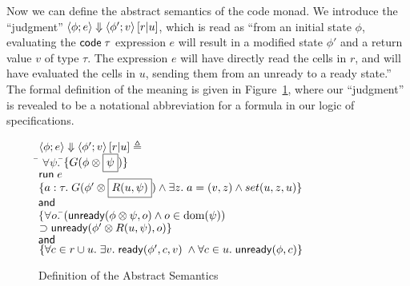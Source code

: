 \documentclass[preprint,natbib]{sigplanconf}
\begin{document}
Now we can define the abstract semantics of the code monad. We
introduce the ``judgment'' $\left<{\phi};{e}\right>\Downarrow\left<{\phi'};{v}\right>\left[{r}|{u}\right]$, which is
read as ``from an initial state $\phi$, evaluating the
$\mbox{\textsf{{code}}}\;{\tau}$ expression $e$ will result in a modified state
$\phi'$ and a return value $v$ of type $\tau$. The expression $e$ will
have directly read the cells in $r$, and will have evaluated the cells
in $u$, sending them from an unready to a ready state.''  The formal
definition of the meaning is given in Figure~\ref{abstract-semantics},
where our ``judgment'' is revealed to be a notational abbreviation for
a formula in our logic of specifications.


\begin{figure}
{\small
\begin{tabbing}
$\left<{\phi};{e}\right>\Downarrow\left<{\phi'};{v}\right>\left[{r}|{u}\right] \triangleq$ \\[0.5em]
\;\;\= $\forall \psi.\;$\=$\{{G(\phi \otimes \boxed{\psi})}\}$ \\
    \>                  \>${\mbox{\textsf{{run}}}\; e}$ \\
    \>                  \>$\{{a:\tau.\;
                             G(\phi' \otimes \boxed{R(u, \psi)})
                             \land \exists z.\; a = (v, z) \land set(u, z, u)}\}$ \\
    \>                  \>$\!\!\;\mbox{\textsf{{and}}}\;$ \\
    \>                  \>$\{\forall o.\;$\=$(\mbox{\textsf{{unready}}}({\phi \otimes \psi}, {o}) \land o \in \mbox{dom}({\psi}))$ \\
    \>                  \> \> $\supset \mbox{\textsf{{unready}}}({\phi' \otimes R(u, \psi)}, {o})\}$ \\
\>$\!\!\;\mbox{\textsf{{and}}}\;$ \\ 
\>$\{\forall c \in r \cup u.\; \exists v.\; \mbox{\textsf{{ready}}}({\phi'}, {c}, {v}) \;\land \forall c \in u.\; \mbox{\textsf{{unready}}}({\phi}, {c})\}$ 
\end{tabbing}
}
\caption{Definition of the Abstract Semantics}
\label{abstract-semantics}
\end{figure}
\end{document}

